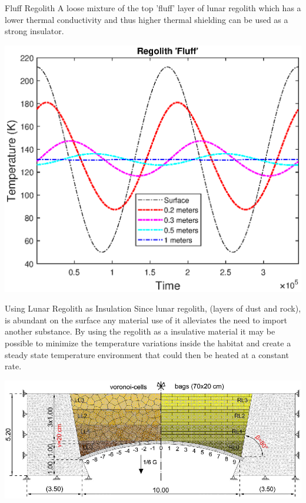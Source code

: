 \documentclass{beamer}
\begin{document}
\begin{frame}{Fluff Regolith}
A loose mixture of the top 'fluff' layer of lunar regolith  which has a lower thermal conductivity and thus higher thermal shielding can be used as a strong insulator\cite{Malla}.
 \begin{center}
             \includegraphics[width= .75\textwidth]{Processed_Regolith.eps}   
      \end{center}  
\end{frame}


\begin{frame}{Using Lunar Regolith as Insulation}
Since lunar regolith, (layers of dust and rock), is abundant on the surface any material use of it  alleviates the need to import another substance. By using the regolith as a insulative material it may be possible to minimize the temperature variations inside the habitat and create a steady state temperature environment that could then be heated at a constant rate.
 \begin{center}
             \includegraphics[width=.75\textwidth]{bags.eps}   
      \end{center}  

\end{frame}
\end{document}
